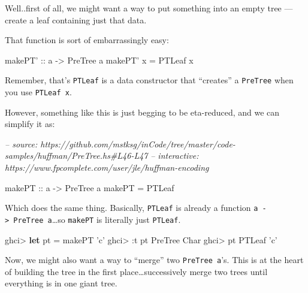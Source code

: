 \documentclass[]{article}
\newenvironment{Shaded}{}{}
\newcommand{\CharTok}[1]{\textcolor[rgb]{0.25,0.44,0.63}{#1}}
\newcommand{\CommentTok}[1]{\textcolor[rgb]{0.38,0.63,0.69}{\textit{#1}}}
\newcommand{\DataTypeTok}[1]{\textcolor[rgb]{0.56,0.13,0.00}{#1}}
\newcommand{\FunctionTok}[1]{\textcolor[rgb]{0.02,0.16,0.49}{#1}}
\newcommand{\KeywordTok}[1]{\textcolor[rgb]{0.00,0.44,0.13}{\textbf{#1}}}
\newcommand{\NormalTok}[1]{#1}
\newcommand{\OtherTok}[1]{\textcolor[rgb]{0.00,0.44,0.13}{#1}}
\begin{document}
Well..first of all, we might want a way to put something into an empty tree ---
create a leaf containing just that data.

That function is sort of embarrassingly easy:

\begin{Shaded}
\begin{Highlighting}[]
\OtherTok{makePT' ::}\NormalTok{ a }\OtherTok{->} \DataTypeTok{PreTree}\NormalTok{ a}
\NormalTok{makePT' x }\FunctionTok{=} \DataTypeTok{PTLeaf}\NormalTok{ x}
\end{Highlighting}
\end{Shaded}

Remember, that's \texttt{PTLeaf} is a data constructor that ``creates'' a
\texttt{PreTree} when you use \texttt{PTLeaf\ x}.

However, something like this is just begging to be eta-reduced, and we can
simplify it as:

\begin{Shaded}
\begin{Highlighting}[]
\CommentTok{-- source: https://github.com/mstksg/inCode/tree/master/code-samples/huffman/PreTree.hs#L46-L47}
\CommentTok{-- interactive: https://www.fpcomplete.com/user/jle/huffman-encoding}

\OtherTok{makePT ::}\NormalTok{ a }\OtherTok{->} \DataTypeTok{PreTree}\NormalTok{ a}
\NormalTok{makePT }\FunctionTok{=} \DataTypeTok{PTLeaf}
\end{Highlighting}
\end{Shaded}

Which does the same thing. Basically, \texttt{PTLeaf} is already a function
\texttt{a\ -\textgreater{}\ PreTree\ a}\ldots{}so \texttt{makePT} is literally
just \texttt{PTLeaf}.

\begin{Shaded}
\begin{Highlighting}[]
\NormalTok{ghci}\FunctionTok{>} \KeywordTok{let}\NormalTok{ pt }\FunctionTok{=}\NormalTok{ makePT }\CharTok{'c'}
\NormalTok{ghci}\FunctionTok{>} \FunctionTok{:}\NormalTok{t pt}
\DataTypeTok{PreTree} \DataTypeTok{Char}
\NormalTok{ghci}\FunctionTok{>}\NormalTok{ pt}
\DataTypeTok{PTLeaf} \CharTok{'c'}
\end{Highlighting}
\end{Shaded}

Now, we might also want a way to ``merge'' two \texttt{PreTree\ a}'s. This is at
the heart of building the tree in the first place\ldots{}successively merge two
trees until everything is in one giant tree.
\end{document}
